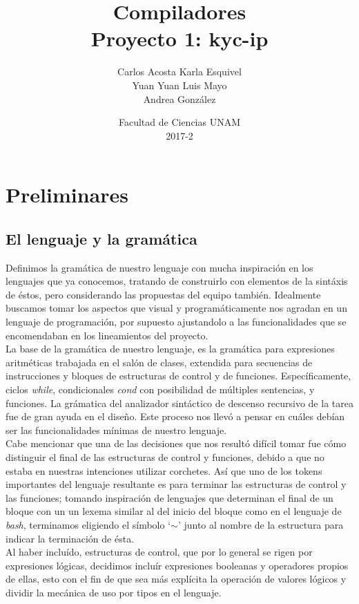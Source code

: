 \documentclass[12pt]{article}
\title{Compiladores\\ Proyecto 1: kyc-ip}
\author{Carlos Acosta \qquad Karla Esquivel \\ Yuan Yuan \qquad Luis Mayo \\ Andrea González}
\date{Facultad de Ciencias UNAM \\ 2017-2}
\begin{document}
\maketitle
\tableofcontents
\newpage

\section{Preliminares}
\subsection{El lenguaje y la gramática}
Definimos la gramática de nuestro lenguaje con mucha inspiración en los lenguajes que ya conocemos, tratando de construirlo con elementos de la sintáxis de éstos, pero considerando las propuestas del equipo también. Idealmente buscamos tomar los aspectos que visual y programáticamente nos agradan en un lenguaje de programación, por supuesto ajustandolo a las funcionalidades que se encomendaban en los lineamientos del proyecto.\\

La base de la gramática de nuestro lenguaje, es la gramática para expresiones aritméticas trabajada en el salón de clases, extendida para secuencias de instrucciones y bloques de estructuras de control y de funciones. Específicamente, ciclos \textit{while}, condicionales \textit{cond} con posibilidad de múltiples sentencias, y funciones. La grámatica del analizador sintáctico de descenso recursivo de la tarea fue de gran ayuda en el diseño. Este proceso nos llevó a pensar en cuáles debían ser las funcionalidades mínimas de nuestro lenguaje. \\

Cabe mencionar que una de las decisiones que nos resultó difícil tomar fue cómo distinguir el final de las estructuras de control y funciones, debido a que no estaba en nuestras intenciones utilizar corchetes. Así que uno de los tokens importantes del lenguaje resultante es para terminar las estructuras de control y las funciones; tomando inspiración de lenguajes que determinan el final de un bloque con un un lexema similar al del inicio del bloque como en el lenguaje de \textit{bash}, terminamos eligiendo el símbolo `$\sim$'\; junto al nombre de la estructura para indicar la terminación de ésta. \\

Al haber incluído, estructuras de control, que por lo general se rigen por expresiones lógicas, decidimos incluír expresiones booleanas y operadores propios de ellas, esto con el fin de que sea más explícita la operación de valores lógicos y dividir la mecánica de uso por tipos en el lenguaje.\\ 
\end{document}
